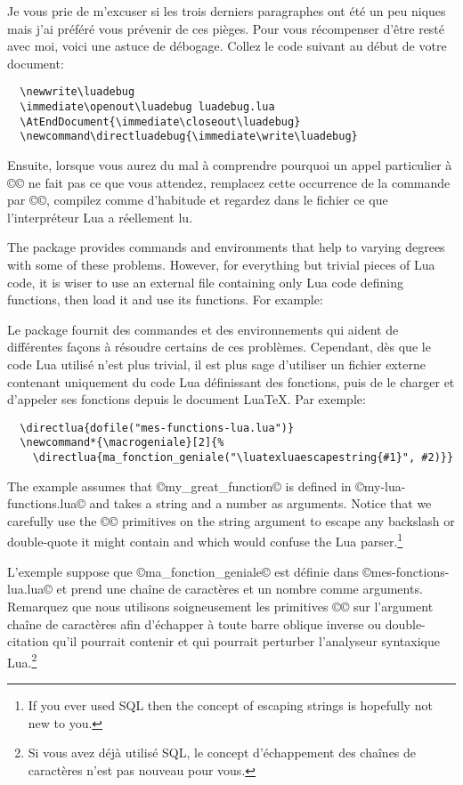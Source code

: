 \documentclass{lltxdoc}
\begin{document}
Je vous prie de m'excuser si les trois derniers paragraphes ont été un peu \tex{}niques
mais j'ai préféré vous prévenir de ces pièges. Pour vous récompenser d'être resté
avec moi, voici une astuce de débogage.
Collez le code suivant au début de votre document:
\begin{Verbatim}
  \newwrite\luadebug
  \immediate\openout\luadebug luadebug.lua
  \AtEndDocument{\immediate\closeout\luadebug}
  \newcommand\directluadebug{\immediate\write\luadebug}
\end{Verbatim}
Ensuite, lorsque vous aurez du mal à comprendre pourquoi un appel particulier
à ©\directlua© ne fait pas ce que vous attendez, remplacez cette occurrence
de la commande par ©\directluadebug©, compilez comme d'habitude et regardez
dans le fichier  ce que l'interpréteur Lua a réellement lu.


The  package provides commands and environments that help to
varying degrees with some of these problems. However, for everything but
trivial pieces of Lua code, it is wiser to use an external file containing
only Lua code defining functions, then load it and use its functions. For
example:

Le package  fournit des commandes et des environnements qui aident de différentes façons à résoudre certains de ces problèmes. Cependant, dès que le code Lua utilisé n'est plus trivial, il est plus sage d'utiliser un fichier externe contenant uniquement du code Lua définissant des fonctions, puis de le charger et d'appeler ses fonctions depuis le document LuaTeX. Par exemple:
\begin{Verbatim}
  \directlua{dofile("mes-functions-lua.lua")}
  \newcommand*{\macrogeniale}[2]{%
    \directlua{ma_fonction_geniale("\luatexluaescapestring{#1}", #2)}}
\end{Verbatim}
The example assumes that ©my_great_function© is defined in
©my-lua-functions.lua© and takes a string and a number as arguments. Notice
that we carefully use the ©\luatexluaescapestring© primitives on the string
argument to escape any backslash or double-quote it might contain and which
would confuse the Lua parser.\footnote{If you ever used SQL then the concept
  of escaping strings is hopefully not new to you.}

L'exemple suppose que ©ma_fonction_geniale© est définie dans ©mes-fonctions-lua.lua© et prend une chaîne de caractères et un nombre comme arguments. Remarquez que nous utilisons soigneusement les primitives ©\luatexluaescapestring© sur l'argument chaîne de caractères afin d'échapper à toute barre oblique inverse ou double-citation qu'il pourrait contenir et qui pourrait perturber l'analyseur syntaxique Lua.\footnote{Si vous avez déjà utilisé SQL, le concept d'échappement des chaînes de caractères n'est pas nouveau pour vous.}
\end{document}
